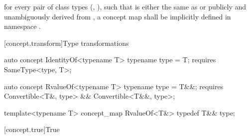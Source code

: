 \documentclass[american,twoside]{book}
\begin{document}
\begin{itemdescr}
\pnum
\mbox{\requires}
for every pair of class types (\mbox{}, \mbox{}),
such that \mbox{} is either the same as or publicly and
unambiguously derived from \mbox{}, a concept map
\mbox{} shall be implicitly defined in namespace
\mbox{}.
\end{itemdescr}

[concept.transform]{Type transformations}
\pnum
{}

\pnum
{}

\begin{itemdecl}
auto concept IdentityOf<typename T> {
  typename type = T;
  requires SameType<type, T>;
}
\end{itemdecl}

\begin{itemdescr}
\pnum
{} 
\end{itemdescr}

\begin{itemdecl}
auto concept RvalueOf<typename T> {
  typename type = T&&;
  requires Convertible<T&, type> && Convertible<T&&, type>;
}
\end{itemdecl}

\begin{itemdescr}
\pnum
{} 
\end{itemdescr}

\begin{itemdecl}
template<typename T> concept_map RvalueOf<T&> {
  typedef T&& type;
}
\end{itemdecl}

\begin{itemdescr}
\pnum
{}
\end{itemdescr}

[concept.true]{True}
\end{document}
